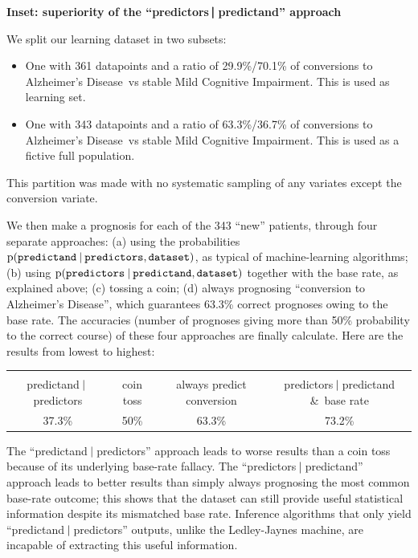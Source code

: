 \documentclass[utf8]{FrontiersinHarvard} %
\newcommand*{\amp}{\&}
\newcommand*{\p}{\mathrm{p}}%
\renewcommand*{\|}[1][]{\nonscript\:#1\vert\nonscript\:\mathopen{}}
\newcommand*{\ad}{Alzheimer's Disease}
\newcommand*{\mci}{Mild Cognitive Impairment}
\newcommand*{\ljm}{Ledley-Jaynes machine}
\begin{document}
\begin{table}[t]
  \begin{framed}
  \small
  \begin{center}
    \textbf{Inset: superiority of the \enquote{predictors$\pmb{\|}$predictand} approach}\label{tab:superiority_predictors_given_predictand}
  \end{center}
    We split our learning dataset in two subsets:
    \begin{itemize}
    \item One with 361 datapoints and a ratio of 29.9\%/70.1\% of conversions to \ad\ vs stable \mci. This is used as learning set.
    \item One with 343 datapoints and a ratio of 63.3\%/36.7\% of conversions to \ad\ vs stable \mci. This is used as a fictive full population.
    \end{itemize}
    This partition was made with no systematic sampling of any variates except the conversion variate.

    We then make a prognosis for each of the 343 \enquote{new} patients, through four separate approaches: (a) using the probabilities $\p(\texttt{predictand} \| \texttt{predictors}, \texttt{dataset})$, as typical of machine-learning algorithms; (b) using $\p(\texttt{predictors} \| \texttt{predictand}, \texttt{dataset})$ together with the base rate, as explained above; (c) tossing a coin; (d) always prognosing \enquote{conversion to \ad}, which guarantees 63.3\% correct prognoses owing to the base rate. The accuracies (number of prognoses giving more than 50\% probability to the correct course) of these four approaches are finally calculate. Here are the results from lowest to highest:

    \medskip
    { 
      \centering
      \begin{tabular}{cccc}
        \hline\\[-\jot]
        {\scriptsize predictand$\|$predictors}&{\scriptsize coin toss}&{\scriptsize always predict conversion}&{\scriptsize predictors$\|$predictand \amp\ base rate}
        \\[1\jot]
        37.3\% & 50\% & 63.3\% & 73.2\%\\[\jot]
        \hline
      \end{tabular}

    }
    \medskip
    
    The \enquote{predictand$\|$predictors} approach leads to worse results than a coin toss because of its underlying base-rate fallacy. The \enquote{predictors$\|$predictand} approach leads to better results than simply always prognosing the most common base-rate outcome; this shows that the dataset can still provide useful statistical information despite its mismatched base rate. Inference algorithms that only yield \enquote{predictand$\|$predictors} outputs, unlike the \ljm, are incapable of extracting this useful information.
  \end{framed}
\end{table}
\end{document}
